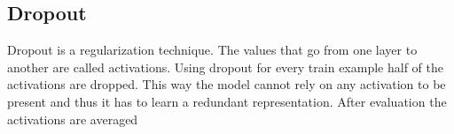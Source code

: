 \documentclass{article}
\begin{document}
\subsection{Dropout}
	Dropout is a regularization technique. The values that go from one layer to another are called activations. Using dropout for every train example half of the activations are dropped. This way the model cannot rely on any activation to be present and thus it has to learn a redundant representation. After evaluation the activations are averaged
\end{document}

